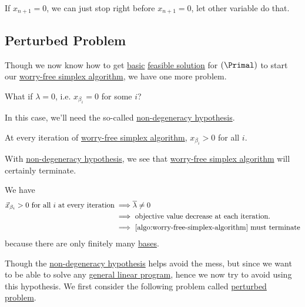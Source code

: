 \begin{remark}
	If \(x_{n+1} = 0\), we can just stop right before \(x_{n+1} = 0\), let other variable do that.
\end{remark}

\subsection{Perturbed Problem}
Though we now know how to get \hyperref[def:basic-solution]{basic} \hyperref[def:feasible-solution]{feasible solution} for \((\Primal)\) to start our \hyperref[algo:worry-free-simplex-algorithm]{worry-free simplex algorithm}, we have one more problem.

\begin{problem}\label{prob:degenerate-problem}
What if \(\lambda = 0\), i.e. \(x_{\beta _{i} } = 0\) for some \(i\)?
\end{problem}

In this case, we'll need the so-called \hyperref[conj:non-degeneracy-hypothesis]{non-degeneracy hypothesis}.

\begin{conjecture}\label{conj:non-degeneracy-hypothesis}
	At every iteration of \hyperref[algo:worry-free-simplex-algorithm]{worry-free simplex algorithm}, \(x_{\beta _{i} } > 0\) for all \(i\).
\end{conjecture}

\begin{remark}
	With \hyperref[conj:non-degeneracy-hypothesis]{non-degeneracy hypothesis}, we see that \hyperref[algo:worry-free-simplex-algorithm]{worry-free simplex algorithm} will certainly terminate.
\end{remark}
\begin{explanation}
	We have
	\[
		\begin{split}
			\vec{x}_{\beta_i} > 0 \text{ for all \(i\) at every iteration}
			\implies & \overline{\lambda} \neq 0                                          \\
			\implies & \text{ objective value decrease at each iteration.}                \\
			\implies & \text{ \autoref{algo:worry-free-simplex-algorithm} must terminate}
		\end{split}
	\]
	because there are only finitely many \hyperref[def:basis]{bases}.
\end{explanation}

Though the \hyperref[conj:non-degeneracy-hypothesis]{non-degeneracy hypothesis} helps avoid the mess, but since we want to be able to solve any \hyperref[def:general-linear-programming-problem]{general linear program}, hence we now try to avoid using this hypothesis. We first consider the following problem called \hyperref[def:perturbed-problem]{perturbed problem}.

